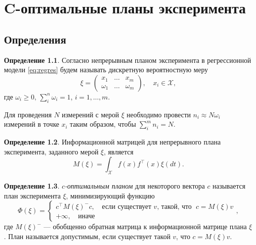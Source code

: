 \documentclass[specialist,
               substylefile = spbu.rtx,
               subf,href,colorlinks=true, 12pt]{disser}
\theoremstyle{definition}
\newtheorem{definition}{Определение}
\begin{document}
  
  
  

\chapter{C-оптимальные планы эксперимента}

\section{Определения}

  \begin{definition}
  Согласно \cite{kiefer1974} непрерывным планом эксперимента в регрессионной модели \eqref{eq:regres} будем называть дискретную вероятностную меру
  \begin{equation*}
    \xi = 
      \begin{pmatrix}
        x_1 & \ldots & x_m \\
        \omega_1 & \ldots & \omega_m
      \end{pmatrix}, \quad x_i \in \mathcal{X},
  \end{equation*}
   где $\omega_i \geqslant 0, \, \sum_i^n \omega_i = 1$, $i = 1, \ldots, m$.
  \end{definition}

  Для проведения $N$ измерений с мерой $\xi$ необходимо провести $n_i \approx N \omega_i$ измерений в точке $x_i$ таким образом, чтобы $\sum^m_i n_i = N$.

  \begin{definition}
  Информационной матрицей для непрерывного плана эксперимента, заданного мерой $\xi$, является 
  \begin{equation*}
    M(\xi) = \int_{\mathcal{X}} f(x) f^\top(x) \xi (dt).
  \end{equation*}
  \end{definition}
  
  \begin{definition}
  \label{def:coptim}
  \textit{$c$-оптимальным планом} для некоторого вектора $c$ называется план эксперимента $\xi$, минимизирующий функцию
  \begin{equation}
  \label{eq:cdef}
    \Phi(\xi) = \begin{cases}
      c^\top M(\xi)^{-} c, \quad \text{если существует } v \text{, такой, что } \; c = M(\xi) v\\
      +\infty, \quad  \text{иначе}
    \end{cases},
  \end{equation}
  где $M(\xi)^{-}$ --- обобщенно обратная матрица к информационной матрице плана $\xi$.
  План называется допустимым, если существует такой $v$, что $c = M(\xi) v$.
  \end{definition}
  
\end{document}
